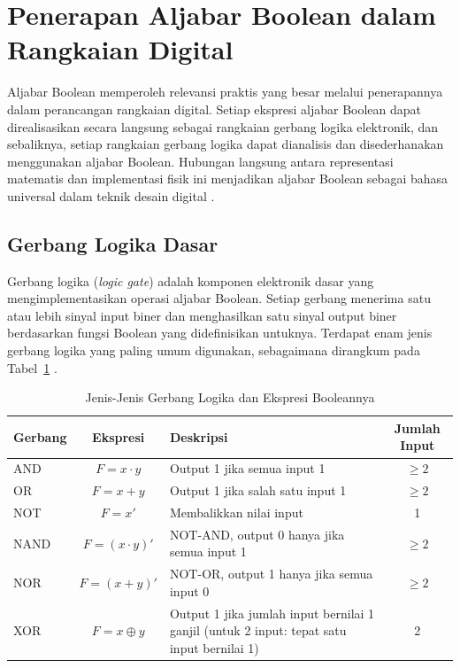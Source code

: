 \section{Penerapan Aljabar Boolean dalam Rangkaian Digital}

Aljabar Boolean memperoleh relevansi praktis yang besar melalui penerapannya dalam perancangan rangkaian digital. Setiap ekspresi aljabar Boolean dapat direalisasikan secara langsung sebagai rangkaian gerbang logika elektronik, dan sebaliknya, setiap rangkaian gerbang logika dapat dianalisis dan disederhanakan menggunakan aljabar Boolean. Hubungan langsung antara representasi matematis dan implementasi fisik ini menjadikan aljabar Boolean sebagai bahasa universal dalam teknik desain digital \cite{grinnell_logic}.

\subsection{Gerbang Logika Dasar}

Gerbang logika (\textit{logic gate}) adalah komponen elektronik dasar yang mengimplementasikan operasi aljabar Boolean. Setiap gerbang menerima satu atau lebih sinyal input biner dan menghasilkan satu sinyal output biner berdasarkan fungsi Boolean yang didefinisikan untuknya. Terdapat enam jenis gerbang logika yang paling umum digunakan, sebagaimana dirangkum pada Tabel~\ref{tab:gerbang-logika} \cite{hackatronic}.

\begin{table}[H]
\centering
\small
\renewcommand{\arraystretch}{1.3}
\begin{tabular}{|l|c|>{\raggedright\arraybackslash}p{4.5cm}|c|}
\hline
\textbf{Gerbang} & \textbf{Ekspresi} & \textbf{Deskripsi} & \textbf{Jumlah Input} \\ \hline
AND & $F = x \cdot y$ & Output 1 jika semua input 1 & $\geq 2$ \\ \hline
OR & $F = x + y$ & Output 1 jika salah satu input 1 & $\geq 2$ \\ \hline
NOT & $F = x'$ & Membalikkan nilai input & 1 \\ \hline
NAND & $F = (x \cdot y)'$ & NOT-AND, output 0 hanya jika semua input 1 & $\geq 2$ \\ \hline
NOR & $F = (x + y)'$ & NOT-OR, output 1 hanya jika semua input 0 & $\geq 2$ \\ \hline
XOR & $F = x \oplus y$ & Output 1 jika jumlah input bernilai 1 ganjil (untuk 2 input: tepat satu input bernilai 1) & 2 \\ \hline
\end{tabular}
\caption{Jenis-Jenis Gerbang Logika dan Ekspresi Booleannya}
\label{tab:gerbang-logika}
\end{table}

